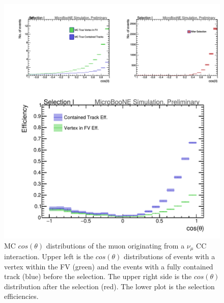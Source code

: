 \begin{figure}[htp!]
\includegraphics[width=\textwidth]{figs/truth_mucostheta.png}
\caption{MC $cos(\theta)$ distributions of the muon originating from a $\nu_{\mu}$ CC interaction. Upper left is the $cos(\theta)$ distributions of events with a vertex within the FV (green) and the events with a fully contained track (blue) before the selection. The upper right side is the $cos(\theta)$ distribution after the selection (red). The lower plot is the selection efficiencies.}
\label{fig:angle1}
\end{figure}

